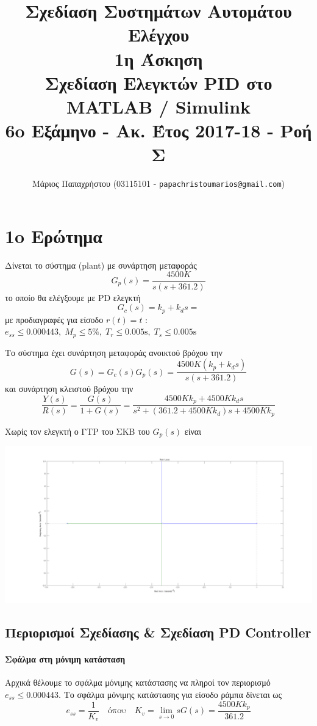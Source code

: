 \documentclass[a4paper,oneside, 10pt]{article}
\title{\textbf{Σχεδίαση Συστημάτων Αυτομάτου Ελέγχου} \\ 1η Άσκηση \\ \large{Σχεδίαση Ελεγκτών PID στο MATLAB / Simulink} \\ \small 6o Εξάμηνο - Ακ. Έτος 2017-18 - Ροή Σ}
\author{Μάριος Παπαχρήστου (03115101 - \texttt{papachristoumarios@gmail.com}) }
\date{}
\begin{document}
\maketitle

\section*{1o Ερώτημα} 

Δίνεται το σύστημα (plant) με συνάρτηση μεταφοράς $$G_p (s) = \frac {4500K} {s(s + 361.2)}$$ το οποίο θα ελέγξουμε με PD ελεγκτή $$G_c(s) = k_p + k_d s = $$ με προδιαγραφές για είσοδο $r(t) = t $ : $e_{ss} \le 0.000443, \; M_p \le 5 \%, \; T_r \le 0.005 \mathrm s, \; T_s \le 0.005 \mathrm s$

Το σύστημα έχει συνάρτηση μεταφοράς ανοικτού βρόχου την $$G(s) = G_c(s) G_p(s) = 
\frac { 4500K (k_p + k_d s) }  {s (s + 361.2) } $$ και συνάρτηση κλειστού βρόχου την 
$$\frac {Y(s)} {R(s)} = \frac {G(s)} {1 + G(s)} = \frac {4500 K k_p +  4500 K k_ds} {s^2 + (361.2 + 4500Kk_d)s + 4500 K k_p  }$$


Χωρίς τον ελεγκτή ο ΓΤΡ του ΣΚΒ του $G_p(s)$ είναι 

\includegraphics[width=\textwidth]{plant_rlocus.png}



\subsection*{Περιορισμοί Σχεδίασης \& Σχεδίαση PD Controller} 


\paragraph{Σφάλμα στη μόνιμη κατάσταση} Αρχικά θέλουμε το σφάλμα μόνιμης κατάστασης να πληροί τον περιορισμό $e_{ss} \le 0.000443$. Το σφάλμα μόνιμης κατάστασης για είσοδο ράμπα δίνεται ως $$e_{ss} = \frac 1 {K_v}  \quad \mathrm{όπου} \quad K_v = \lim_{s \to 0} sG(s) = \frac {4500Kk_p} {361.2}$$ 
\end{document}
